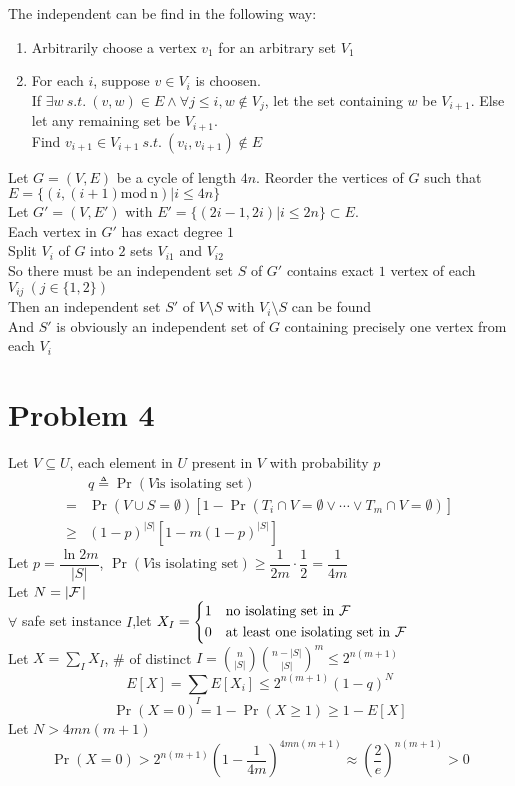 \documentclass[12pt]{article}
\def\F{\mathcal{F}{\ssc\,}}
\begin{document}
The independent can be find in the following way:
\begin{enumerate}
	\item Arbitrarily choose a vertex $v_1$ for an arbitrary set $V_1$
	\item For each $i$, suppose $v \in V_i$ is choosen.\\
	 If $\exists w~s.t.~ (v,w)\in E\wedge \forall j\leq i, w\not\in V_j$, let the set containing $w$ be $V_{i+1}$. Else let any remaining set be $V_{i+1}$. \\
	 Find $v_{i+1}\in V_{i+1}~s.t.~(v_i, v_{i+1})\not\in E$\\
\end{enumerate}	 
Let $G=(V, E)$ be a cycle of length $4n$. Reorder the vertices of $G$ such that $E=\{\left(i,(i+1)\mathrm{mod~n}\right)|i\leq 4n\}$\\
Let $G'=(V,E')$ with $E'=\{(2i-1,2i)|i\leq 2n\}\subset E$. \\
Each vertex in $G'$ has exact degree $1$\\
Split $V_i$ of $G$ into $2$ sets $V_{i1}$ and $V_{i2}$\\
So there must be an independent set $S$ of $G'$ contains exact $1$ vertex of each $V_{ij}~(j\in\{1,2\})$\\
Then an independent set $S'$ of $V\setminus S$ with $V_i\setminus S$ can be found\\
And $S'$ is obviously an independent set of $G$ containing precisely one vertex from each $V_i$

\section*{Problem 4}
Let $V\subseteq U$, each element in $U$ present in $V$ with probability $p$
\begin{align*}
&q\triangleq\Pr(V \text{is isolating set})\\
=&\Pr(V\cup S=\emptyset)\left[1-\Pr(T_i\cap V=\emptyset\vee\cdots\vee T_m\cap V=\emptyset)\right]\\
\geq & (1-p)^{|S|}\left[1-m(1-p)^{|S|}\right]
\end{align*}
Let $p=\dfrac{\ln 2m}{|S|}$, $\Pr(V \text{is isolating set})\geq\dfrac{1}{2m}\cdot \dfrac{1}{2}=\dfrac{1}{4m}$\\
Let $N=|\F|$\\
 $\forall$ safe set instance $I$,let 
$
X_I=\left\{
	\begin{aligned}
	1& ~~~\text{no isolating set in } \F\\
	0& ~~~\text{at least one isolating set in } \F\\
	\end{aligned}
\right.
$\\
Let $X=\sum_I X_I$, \# of distinct $\displaystyle I = \binom{n}{\left|S\right|}\binom{n-|S|}{|S|}^m\leq 2^{n(m+1)}$ 
$$E[X]=\sum_I E[X_i]\leq 2^{n(m+1)}(1-q)^N$$
$$\Pr(X=0)=1-\Pr(X\geq 1)\geq 1-E[X]$$
Let $N>4mn(m+1)$
 $$\Pr(X=0)>2^{n(m+1)}\left(1-\dfrac{1}{4m}\right)^{4mn(m+1)}\approx\left(\dfrac{2}{e}\right)^{n(m+1)}>0$$
\end{document}
